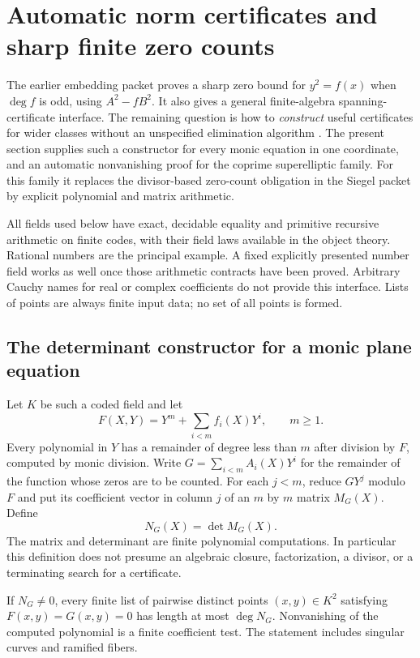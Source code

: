 \section{Automatic norm certificates and sharp finite zero counts}
\label{sec:norm-certificates}

The earlier embedding packet proves a sharp zero bound for
$y^2=f(x)$ when $\deg f$ is odd, using
$A^2-fB^2$. It also gives a general finite-algebra spanning-certificate
interface. The remaining question is how to \emph{construct} useful
certificates for wider classes without an unspecified elimination
algorithm \cite{repo-embedding,repo-siegel}. The present section supplies such a constructor for every
monic equation in one coordinate, and an automatic nonvanishing proof
for the coprime superelliptic family. For this family it replaces the
divisor-based zero-count obligation in the Siegel packet by explicit
polynomial and matrix arithmetic.

All fields used below have exact, decidable equality and primitive
recursive arithmetic on finite codes, with their field laws available
in the object theory. Rational numbers are the principal example. A
fixed explicitly presented number field works as well once those
arithmetic contracts have been proved. Arbitrary Cauchy names for real
or complex coefficients do not provide this interface. Lists of points
are always finite input data; no set of all points is formed.

\subsection{The determinant constructor for a monic plane equation}

Let $K$ be such a coded field and let
\[
 F(X,Y)=Y^m+\sum_{i<m}f_i(X)Y^i,\qquad m\geq1.
\]
Every polynomial in $Y$ has a remainder of degree less than $m$ after
division by $F$, computed by monic division. Write
$G=\sum_{i<m}A_i(X)Y^i$ for the remainder of the function whose zeros
are to be counted. For each $j<m$, reduce $GY^j$ modulo $F$ and put
its coefficient vector in column $j$ of an $m$ by $m$ matrix $M_G(X)$.
Define
\[
                         N_G(X)=\det M_G(X).
\]
The matrix and determinant are finite polynomial computations. In
particular this definition does not presume an algebraic closure,
factorization, a divisor, or a terminating search for a certificate.

\begin{theorem}\label{thm:general-norm}
If $N_G\ne0$, every finite list of pairwise distinct points
$(x,y)\in K^2$ satisfying $F(x,y)=G(x,y)=0$ has length at most
$\deg N_G$. Nonvanishing of the computed polynomial is a finite
coefficient test. The statement includes singular curves and
ramified fibers.
\end{theorem}

